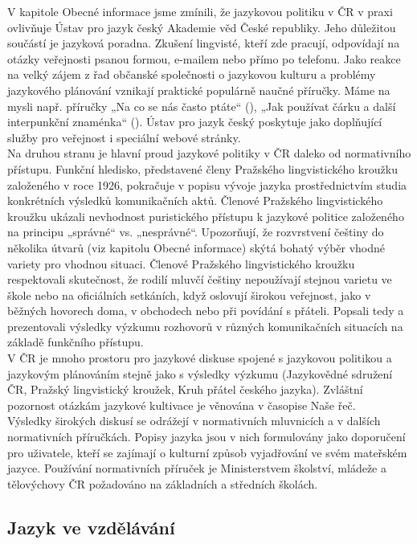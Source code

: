 \documentclass[]{../../metanetpaper}
\begin{document}
\begin{multicols}{2}
V kapitole Obecné informace jsme zmínili, že jazykovou politiku v ČR v praxi ovlivňuje Ústav pro jazyk český Akademie věd České republiky. Jeho důležitou součástí je jazyková poradna. Zkušení lingvisté, kteří zde pracují, odpovídají na otázky veřejnosti psanou formou, e-mailem nebo přímo po telefonu. Jako reakce na velký zájem z řad občanské společnosti o jazykovou kulturu a problémy jazykového plánování vznikají praktické populárně naučné příručky. Máme na mysli např. příručky „Na co se nás často ptáte“ (\cite{Cerna}), „Jak používat čárku a další interpunkční znaménka“ (\cite{Janovec}). Ústav pro jazyk český poskytuje jako doplňující služby pro veřejnost i speciální webové stránky.\cite{Note6}\\
Na druhou stranu je hlavní proud jazykové politiky v ČR daleko od normativního přístupu. Funkční hledisko, představené členy Pražského lingvistického kroužku založeného v roce 1926, pokračuje v popisu vývoje jazyka prostřednictvím studia konkrétních výsledků komunikačních aktů. Členové Pražského lingvistického kroužku ukázali nevhodnost puristického přístupu k jazykové politice založeného na principu „správné“ vs. „nesprávné“. Upozorňují, že rozvrstvení češtiny do několika útvarů (viz kapitolu Obecné informace) skýtá bohatý výběr vhodné variety pro vhodnou situaci. Členové Pražského lingvistického kroužku respektovali skutečnost, že rodilí mluvčí češtiny nepoužívají stejnou varietu ve škole nebo na oficiálních setkáních, když oslovují širokou veřejnost, jako v běžných hovorech doma, v obchodech nebo při povídání s přáteli. Popsali tedy a prezentovali výsledky výzkumu rozhovorů v různých komunikačních situacích na základě funkčního přístupu.\\
V ČR je mnoho prostoru pro jazykové diskuse spojené s jazykovou politikou a jazykovým plánováním stejně jako s výsledky výzkumu (Jazykovědné sdružení ČR, Pražský lingvistický kroužek, Kruh přátel českého jazyka). Zvláštní pozornost otázkám jazykové kultivace je věnována v časopise Naše řeč.\\
Výsledky širokých diskusí se odrážejí v normativních mluvnicích a v dalších normativních příručkách. Popisy jazyka jsou v nich formulovány jako doporučení pro uživatele, kteří se zajímají o kulturní způsob vyjadřování ve svém mateřském jazyce. Používání normativních příruček je Ministerstvem školství, mládeže a tělovýchovy ČR požadováno na základních a středních školách.
  
\subsection{Jazyk ve vzdělávání}


\end{multicols}
\end{document}
